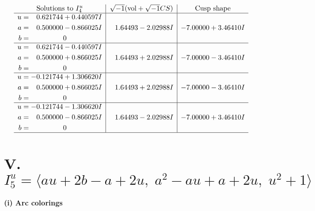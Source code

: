 \documentclass[1p]{elsarticle_modified}
\theoremstyle{definition}
\newcommand{\I}{\sqrt{-1}}
\begin{document}
$$\begin{array}{c|c|c}  
\text{Solutions to }I^u_{4}& \I (\text{vol} + \sqrt{-1}CS) & \text{Cusp shape}\\
 \hline 
\begin{aligned}
u &= \phantom{-}0.621744 + 0.440597 I \\
a &= \phantom{-}0.500000 - 0.866025 I \\
b &= \phantom{-0.000000 } 0\end{aligned}
 & \phantom{-}1.64493 - 2.02988 I & -7.00000 + 3.46410 I \\ \hline\begin{aligned}
u &= \phantom{-}0.621744 - 0.440597 I \\
a &= \phantom{-}0.500000 + 0.866025 I \\
b &= \phantom{-0.000000 } 0\end{aligned}
 & \phantom{-}1.64493 + 2.02988 I & -7.00000 - 3.46410 I \\ \hline\begin{aligned}
u &= -0.121744 + 1.306620 I \\
a &= \phantom{-}0.500000 + 0.866025 I \\
b &= \phantom{-0.000000 } 0\end{aligned}
 & \phantom{-}1.64493 + 2.02988 I & -7.00000 - 3.46410 I \\ \hline\begin{aligned}
u &= -0.121744 - 1.306620 I \\
a &= \phantom{-}0.500000 - 0.866025 I \\
b &= \phantom{-0.000000 } 0\end{aligned}
 & \phantom{-}1.64493 - 2.02988 I & -7.00000 + 3.46410 I\\
 \hline 
 \end{array}$$\newpage\newpage\renewcommand{\arraystretch}{1}
\centering \section*{V. $I^u_{5}= \langle a u+2 b- a+2 u,\;a^2- a u+a+2 u,\;u^2+1 \rangle$}
\flushleft \textbf{(i) Arc colorings}\\
\end{document}
